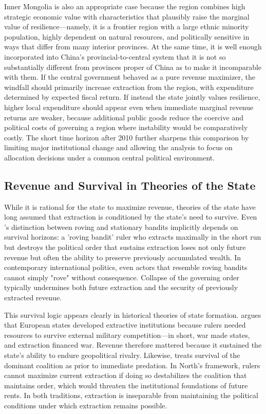 \documentclass[12pt]{article}
\begin{document}
Inner Mongolia is also an appropriate case because the region combines high strategic economic value with characteristics that plausibly raise the marginal value of resilience---namely, it is a frontier region with a large ethnic minority population, highly dependent on natural resources, and politically sensitive in ways that differ from many interior provinces. At the same time, it is well enough incorporated into China's provincial-to-central system that it is not so substantially different from provinces proper of China as to make it incomparable with them. If the central government behaved as a pure revenue maximizer, the windfall should primarily increase extraction from the region, with expenditure determined by expected fiscal return. If instead the state jointly values resilience, higher local expenditure should appear even when immediate marginal revenue returns are weaker, because additional public goods reduce the coercive and political costs of governing a region where instability would be comparatively costly. The short time horizon after 2010 further sharpens this comparison by limiting major institutional change and allowing the analysis to focus on allocation decisions under a common central political environment.

\subsection{Revenue and Survival in Theories of the State}

While it is rational for the state to maximize revenue, theories of the state have long assumed that extraction is conditioned by the state's need to survive. Even \textcite{olson1993}'s distinction between roving and stationary bandits implicitly depends on survival horizons: a 'roving bandit' ruler who extracts maximally in the short run but destroys the political order that sustains extraction loses not only future revenue but often the ability to preserve previously accumulated wealth. In contemporary international politics, even actors that resemble roving bandits cannot simply "rove" without consequence. Collapse of the governing order typically undermines both future extraction and the security of previously extracted revenue.

This survival logic appears clearly in historical theories of state formation. \textcite{tillyCoercionCapitalEuropean2017} argues that European states developed extractive institutions because rulers needed resources to survive external military competition---in short, war made states, and extraction financed war. Revenue therefore mattered because it sustained the state's ability to endure geopolitical rivalry. Likewise, \textcite{alma99147951620001452} treats survival of the dominant coalition as prior to immediate predation. In North's framework, rulers cannot maximize current extraction if doing so destabilizes the coalition that maintains order, which would threaten the institutional foundations of future rents. In both traditions, extraction is inseparable from maintaining the political conditions under which extraction remains possible.
\end{document}
